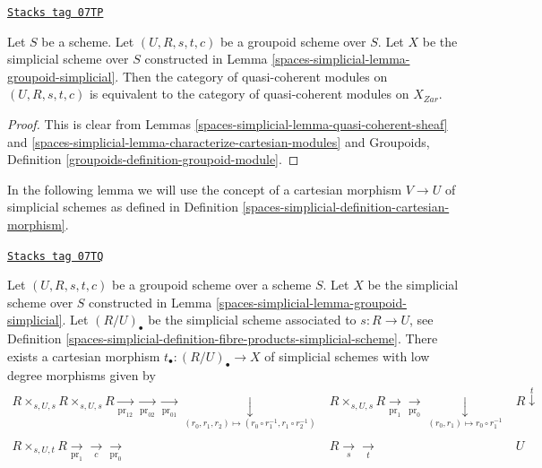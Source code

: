 \begin{lemma}
\label{spaces-simplicial-lemma-quasi-coherent-groupoid-simplicial}
\href{https://stacks.math.columbia.edu/tag/07TP}{\texttt{Stacks tag 07TP}}

Let $S$ be a scheme. Let $(U, R, s, t, c)$ be a groupoid scheme
over $S$. Let $X$ be the simplicial scheme over $S$ constructed
in Lemma \ref{spaces-simplicial-lemma-groupoid-simplicial}.
Then the category of quasi-coherent modules on $(U, R, s, t, c)$
is equivalent to the category of quasi-coherent modules on $X_{Zar}$.
\end{lemma}

\begin{proof}
This is clear from Lemmas
\ref{spaces-simplicial-lemma-quasi-coherent-sheaf} and
\ref{spaces-simplicial-lemma-characterize-cartesian-modules}
and Groupoids, Definition \ref{groupoids-definition-groupoid-module}.
\end{proof}

In the following lemma we will use the concept of a cartesian
morphism $V \to U$ of simplicial schemes as defined in
Definition \ref{spaces-simplicial-definition-cartesian-morphism}.

\begin{lemma}
\label{spaces-simplicial-lemma-quasi-coherent-groupoid-R-cartesian}
\href{https://stacks.math.columbia.edu/tag/07TQ}{\texttt{Stacks tag 07TQ}}

Let $(U, R, s, t, c)$ be a groupoid scheme over a scheme $S$.
Let $X$ be the simplicial scheme over $S$ constructed
in Lemma \ref{spaces-simplicial-lemma-groupoid-simplicial}.
Let $(R/U)_\bullet$ be the simplicial
scheme associated to $s : R \to U$, see
Definition \ref{spaces-simplicial-definition-fibre-products-simplicial-scheme}.
There exists a cartesian morphism $t_\bullet : (R/U)_\bullet \to X$
of simplicial schemes with low degree morphisms given by
$$
\begin{array}{ccc}R \times_{s, U, s} R \times_{s, U, s} R
\underset{\text{pr}_{12}}{\longrightarrow}\underset{\text{pr}_{02}}{\longrightarrow}\underset{\text{pr}_{01}}{\longrightarrow}\underset{(r_0, r_1, r_2) \mapsto (r_0 \circ r_1^{-1}, r_1 \circ r_2^{-1})}{\downarrow} & R \times_{s, U, s} R
\underset{\text{pr}_1}{\longrightarrow}\underset{\text{pr}_0}{\longrightarrow}\underset{(r_0, r_1) \mapsto r_0 \circ r_1^{-1}}{\downarrow} & R \overset{t}{\downarrow} \\  &  &  \\ R \times_{s, U, t} R
\underset{\text{pr}_1}{\longrightarrow}\underset{c}{\longrightarrow}\underset{\text{pr}_0}{\longrightarrow} & R \underset{s}{\longrightarrow}\underset{t}{\longrightarrow} & U\end{array}
$$
\end{lemma}

